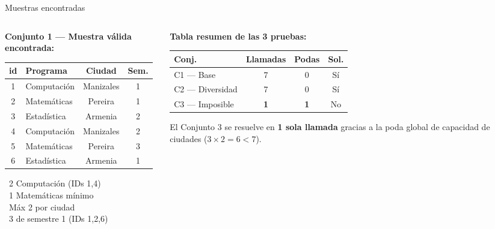 \documentclass[aspectratio=169, 10pt]{beamer}
\begin{document}
\begin{frame}{Muestras encontradas}
  \begin{columns}[T]
    \begin{column}{0.48\textwidth}
      \textbf{Conjunto 1 — Muestra válida encontrada:}
      \vspace{0.2cm}
      \begin{center}
        \small
        \begin{tabular}{clcc}
          \toprule
          \textbf{id} & \textbf{Programa} & \textbf{Ciudad} & \textbf{Sem.} \\
          \midrule
          \rowcolor{unalverde!15} 1 & Computación & Manizales & 1 \\
          2 & Matemáticas & Pereira   & 1 \\
          3 & Estadística & Armenia   & 2 \\
          \rowcolor{unalverde!15} 4 & Computación & Manizales & 2 \\
          5 & Matemáticas & Pereira   & 3 \\
          6 & Estadística & Armenia   & 1 \\
          \bottomrule
        \end{tabular}
      \end{center}
      \vspace{0.2cm}
      \small
      \checkmark\ 2 Computación (IDs 1,4) \\
      \checkmark\ 1 Matemáticas mínimo \\
      \checkmark\ Máx 2 por ciudad \\
      \checkmark\ 3 de semestre 1 (IDs 1,2,6)
    \end{column}
    \begin{column}{0.48\textwidth}
      \textbf{Tabla resumen de las 3 pruebas:}
      \vspace{0.2cm}
      \begin{center}
        \small
        \begin{tabular}{lccc}
          \toprule
          \textbf{Conj.} & \textbf{Llamadas} & \textbf{Podas} & \textbf{Sol.} \\
          \midrule
          C1 — Base       & 7     & 0      & Sí \\
          C2 — Diversidad & 7     & 0      & Sí \\
          C3 — Imposible  & \textbf{1} & \textbf{1} & No \\
          \bottomrule
        \end{tabular}
      \end{center}

      \vspace{0.3cm}
      \begin{tcolorbox}[colback=unalamarillo!20, colframe=unalamarillo!80, title=\small Dato clave]
        \small El Conjunto 3 se resuelve en \textbf{1 sola llamada} gracias a la poda global de capacidad de ciudades ($3 \times 2 = 6 < 7$).
      \end{tcolorbox}
    \end{column}
  \end{columns}
\end{frame}
\end{document}
